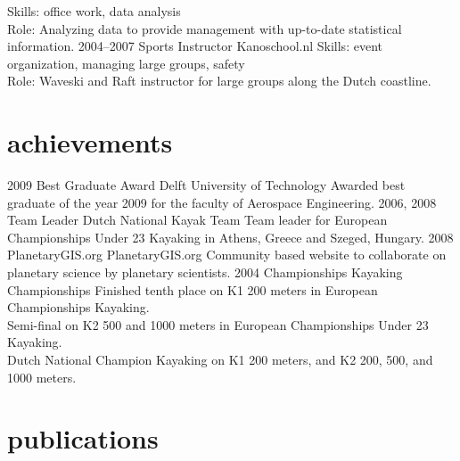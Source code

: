 \documentclass[a4paper]{friggeri-cv}
\begin{document}
\begin{entrylist}
    { {Skills:} { office work, data analysis } \\
    {Role:} {Analyzing data to provide management with up-to-date statistical information. }}
  \entry
    {2004–2007}
    {Sports Instructor}
    {Kanoschool.nl}
    { {Skills:} { event organization, managing large groups, safety } \\
    {Role:} {Waveski and Raft instructor for large groups along the Dutch coastline. }}
\end{entrylist}

\section{achievements}

\begin{entrylist}
  \entry
    {2009}
    {Best Graduate Award}
    {Delft University of Technology}
    {Awarded best graduate of the year 2009 for the faculty of Aerospace Engineering.}
  \entry
    {2006, 2008}
    {Team Leader}
    {Dutch National Kayak Team}
    {Team leader for European Championships Under 23 Kayaking in Athens, Greece and Szeged, Hungary.}
  \entry
    {2008}
    {PlanetaryGIS.org}
    {PlanetaryGIS.org}
    {Community based website to collaborate on planetary science by planetary scientists.}
  \entry
    {2004}
    {Championships}
    {Kayaking Championships}
    {Finished tenth place on K1 200 meters in European Championships Kayaking. \\
    Semi-final on K2 500 and 1000 meters in European Championships Under 23 Kayaking. \\
    Dutch National Champion Kayaking on K1 200 meters, and K2 200, 500, and 1000 meters.
    }
\end{entrylist}

\section{publications}

\begin{refsection}
  \nocite{*}
  \printbibliography[sorting=chronological, type=inproceedings, title={international peer-reviewed conferences/proceedings}, notkeyword={france}, heading=subbibliography]
\end{refsection}
\begin{refsection}
  \nocite{*}
  \printbibliography[sorting=chronological, type=inproceedings, title={local peer-reviewed conferences/proceedings}, keyword={france}, heading=subbibliography]
\end{refsection}
\end{document}

